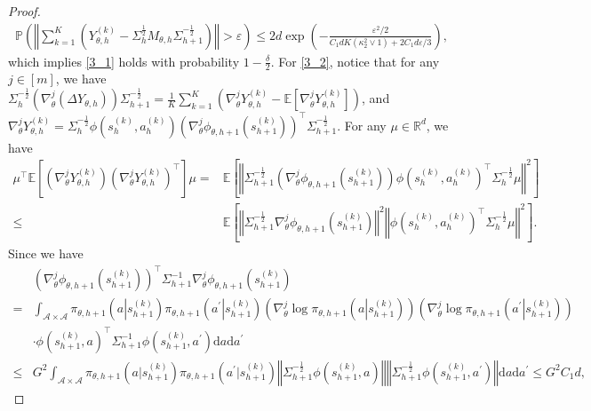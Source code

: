 \documentclass{article}
\numberwithin{equation}{section}
\begin{document}
\begin{proof}
\begin{align*}
    \mathbb{P}\left(\left\Vert\sum_{k=1}^K\left(Y_{\theta,h}^{(k)}-\Sigma_h^{\frac{1}{2}}M_{\theta,h}\Sigma_{h+1}^{-\frac{1}{2}}\right)\right\Vert>\varepsilon\right)\leq 2d\exp\left(-\frac{\varepsilon^2/2}{C_1dK\left(\kappa_2^2\vee 1\right)+2C_1d\varepsilon/3}\right), 
\end{align*}
which implies \eqref{3_1} holds with probability $1-\frac{\delta}{2}$. For \eqref{3_2}, notice that for any $j\in[m]$, we have $\Sigma_h^{-\frac{1}{2}}(\nabla_\theta^j(\Delta Y_{\theta,h}))\Sigma_{h+1}^{-\frac{1}{2}}=\frac{1}{K}\sum_{k=1}^K\left(\nabla_\theta^j Y_{\theta,h}^{(k)}-\mathbb{E}\left[\nabla_\theta^j Y_{\theta,h}^{(k)}\right]\right)$, and $\nabla_\theta^j Y_{\theta,h}^{(k)}=\Sigma_h^{-\frac{1}{2}}\phi\left(s_h^{(k)},a_h^{(k)}\right) \left(\nabla_\theta^j\phi_{\theta,h+1}\left(s_{h+1}^{(k)}\right)\right)^\top\Sigma_{h+1}^{-\frac{1}{2}}$. For any $\mu\in \mathbb{R}^d$, we have
\begin{align*}
    \mu^\top\mathbb{E}\left[\left(\nabla_\theta^j Y_{\theta,h}^{(k)}\right) \left(\nabla_\theta^j Y_{\theta,h}^{(k)}\right)^\top\right]\mu=&\mathbb{E}\left[\left\Vert\Sigma_{h+1}^{-\frac{1}{2}}\left(\nabla_\theta^j\phi_{\theta,h+1}\left(s_{h+1}^{(k)}\right)\right)\phi\left(s_h^{(k)},a_h^{(k)}\right)^\top\Sigma_h^{-\frac{1}{2}}\mu\right\Vert^2\right]\\
    \leq&\mathbb{E}\left[\left\Vert\Sigma_{h+1}^{-\frac{1}{2}}\nabla_\theta^j\phi_{\theta,h+1}\left(s_{h+1}^{(k)}\right)\right\Vert^2\left\Vert\phi\left(s_h^{(k)},a_h^{(k)}\right)^\top\Sigma_h^{-\frac{1}{2}}\mu\right\Vert^2\right]. 
\end{align*}
Since we have 
\begin{align*}
    &\left(\nabla_\theta^j\phi_{\theta,h+1}\left(s_{h+1}^{(k)}\right)\right)^\top\Sigma_{h+1}^{-1}\nabla_\theta^j\phi_{\theta,h+1}\left(s_{h+1}^{(k)}\right)\\
    =&\int_{\mathcal{A}\times\mathcal{A}}\pi_{\theta,h+1}\left(a\left\vert s_{h+1}^{(k)}\right.\right)\pi_{\theta,h+1}\left(a^\prime\left\vert s_{h+1}^{(k)}\right.\right)\left(\nabla_\theta^j\log\pi_{\theta,h+1}\left(a\left\vert s_{h+1}^{(k)}\right.\right)\right)\left(\nabla_\theta^j\log\pi_{\theta,h+1}\left(a^\prime\left\vert s_{h+1}^{(k)}\right.\right)\right)\\
    &\cdot\phi\left(s_{h+1}^{(k)},a\right)^\top\Sigma_{h+1}^{-1}\phi\left(s_{h+1}^{(k)}, a^\prime\right)\mathrm{d}a\mathrm{d}a^\prime\\
    \leq&G^2\int_{\mathcal{A}\times\mathcal{A}}\pi_{\theta,h+1}\left(a\vert s_{h+1}^{(k)}\right)\pi_{\theta,h+1}\left(a^\prime\vert s_{h+1}^{(k)}\right)\left\Vert \Sigma_{h+1}^{-\frac{1}{2}}\phi\left(s_{h+1}^{(k)},a\right)\right\Vert\left\Vert\Sigma_{h+1}^{-\frac{1}{2}}\phi\left(s_{h+1}^{(k)},a^\prime\right)\right\Vert\mathrm{d}a\mathrm{d}a^\prime\leq G^2C_1d,

\end{align*}
\end{proof}
\end{document}
